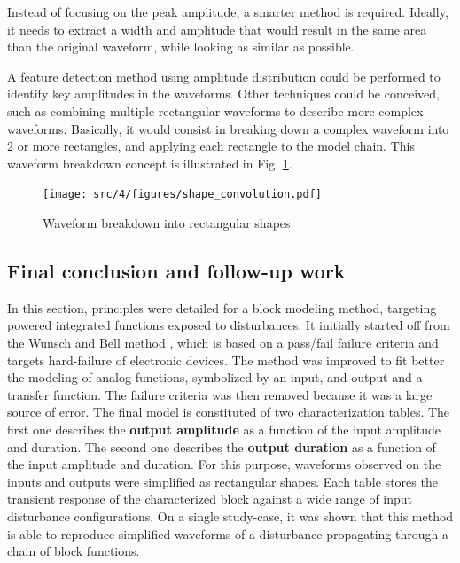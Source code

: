 Instead of focusing on the peak amplitude, a smarter method is required.
Ideally, it needs to extract a width and amplitude that would result in the same area than the original waveform, while looking as similar as possible.

A feature detection method using amplitude distribution could be performed to identify key amplitudes in the waveforms.
Other techniques could be conceived, such as combining multiple rectangular waveforms to describe more complex waveforms.
Basically, it would consist in breaking down a complex waveform into 2 or more rectangles, and applying each rectangle to the model chain.
This waveform breakdown concept is illustrated in Fig. \ref{fig:waveform-deconvolution}.

\begin{figure}[!h]
  \centering
  \texttt{[image: src/4/figures/shape\_convolution.pdf]}
  \caption{Waveform breakdown into rectangular shapes}
  \label{fig:waveform-deconvolution}
\end{figure}

\subsection{Final conclusion and follow-up work}
\label{sec:limits-block-cz-final}

In this section, principles were detailed for a block modeling method, targeting powered integrated functions exposed to disturbances.
It initially started off from the Wunsch and Bell method \cite{wunsch-bell}, which is based on a pass/fail failure criteria and targets hard-failure of electronic devices.
The method was improved to fit better the modeling of analog functions, symbolized by an input, and output and a transfer function.
The failure criteria was then removed because it was a large source of error.
The final model is constituted of two characterization tables.
The first one describes the \textbf{output amplitude} as a function of the input amplitude and duration.
The second one describes the \textbf{output duration} as a function of the input amplitude and duration.
For this purpose, waveforms observed on the inputs and outputs were simplified as rectangular shapes.
Each table stores the transient response of the characterized block against a wide range of input disturbance configurations.
On a single study-case, it was shown that this method is able to reproduce simplified waveforms of a disturbance propagating through a chain of block functions.

